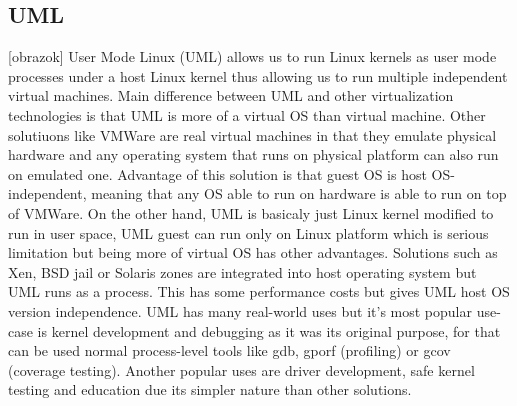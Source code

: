 \begin{itemize}
\section{UML}
[obrazok] User Mode Linux (UML) allows us to run Linux kernels as user mode processes under a host Linux kernel thus allowing us to run multiple independent virtual machines. Main difference between UML and other virtualization technologies is that UML is more of a virtual OS than virtual machine. Other solutiuons like VMWare are real virtual machines in that they emulate physical hardware and any operating system that runs on physical platform can also run on emulated one. Advantage of this solution is that guest OS is host OS-independent, meaning that any OS able to run on hardware is able to run on top of VMWare. On the other hand, UML is basicaly just Linux kernel modified to run in user space, UML guest can run only on Linux platform which is serious limitation but being more of virtual OS has other advantages. Solutions such as Xen, BSD jail or Solaris zones are integrated into host operating system but UML runs as a process. This has some performance costs but gives UML host OS version independence. UML has many real-world uses but it's most popular use-case is kernel development and debugging as it was its original purpose, for that can be used normal process-level tools like gdb, gporf (profiling) or gcov (coverage testing). Another popular uses are driver development, safe kernel testing and education due its simpler nature than other solutions.



\end{itemize}
